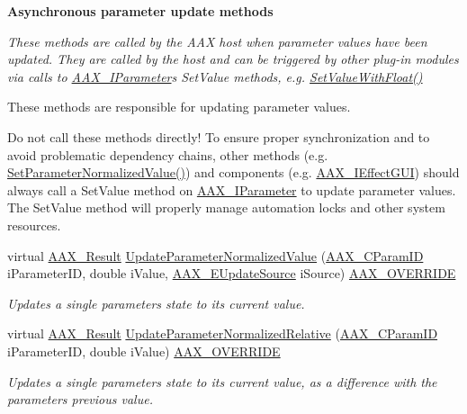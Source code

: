\begin{Indent}{\bf Asynchronous parameter update methods}\par
{\em These methods are called by the A\+A\+X host when parameter values have been updated. They are called by the host and can be triggered by other plug-\/in modules via calls to \hyperlink{a00108}{A\+A\+X\+\_\+\+I\+Parameter}\textquotesingle{}s {\ttfamily Set\+Value} methods, e.\+g. \hyperlink{a00108_a1d37b80bc3a9c4e53fc2c1684f47dfb7}{Set\+Value\+With\+Float()}

These methods are responsible for updating parameter values.

Do not call these methods directly! To ensure proper synchronization and to avoid problematic dependency chains, other methods (e.\+g. \hyperlink{a00018_aa705736fbe6b2cd8cc5721677cea6c20}{Set\+Parameter\+Normalized\+Value()}) and components (e.\+g. \hyperlink{a00098}{A\+A\+X\+\_\+\+I\+Effect\+G\+U\+I}) should always call a {\ttfamily Set\+Value} method on \hyperlink{a00108}{A\+A\+X\+\_\+\+I\+Parameter} to update parameter values. The {\ttfamily Set\+Value} method will properly manage automation locks and other system resources. }\begin{DoxyCompactItemize}
\item 
virtual \hyperlink{a00149_a4d8f69a697df7f70c3a8e9b8ee130d2f}{A\+A\+X\+\_\+\+Result} \hyperlink{a00018_a56a9f41a975b48f583655db7b43aae5a}{Update\+Parameter\+Normalized\+Value} (\hyperlink{a00149_a1440c756fe5cb158b78193b2fc1780d1}{A\+A\+X\+\_\+\+C\+Param\+I\+D} i\+Parameter\+I\+D, double i\+Value, \hyperlink{a00206_a30be0398faf20c6b121239eb9399f3f7}{A\+A\+X\+\_\+\+E\+Update\+Source} i\+Source) \hyperlink{a00149_ac2f24a5172689ae684344abdcce55463}{A\+A\+X\+\_\+\+O\+V\+E\+R\+R\+I\+D\+E}
\begin{DoxyCompactList}\small\item\em Updates a single parameter\textquotesingle{}s state to its current value. \end{DoxyCompactList}\item 
virtual \hyperlink{a00149_a4d8f69a697df7f70c3a8e9b8ee130d2f}{A\+A\+X\+\_\+\+Result} \hyperlink{a00018_a29bbbafe19a5a53b4accbb963dd7d0a6}{Update\+Parameter\+Normalized\+Relative} (\hyperlink{a00149_a1440c756fe5cb158b78193b2fc1780d1}{A\+A\+X\+\_\+\+C\+Param\+I\+D} i\+Parameter\+I\+D, double i\+Value) \hyperlink{a00149_ac2f24a5172689ae684344abdcce55463}{A\+A\+X\+\_\+\+O\+V\+E\+R\+R\+I\+D\+E}
\begin{DoxyCompactList}\small\item\em Updates a single parameter\textquotesingle{}s state to its current value, as a difference with the parameter\textquotesingle{}s previous value. \end{DoxyCompactList}\item 

\end{DoxyCompactItemize}
\end{Indent}

